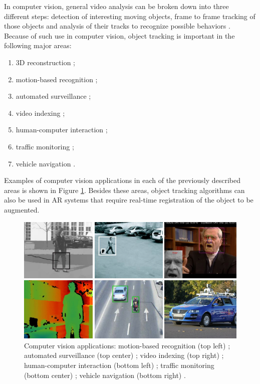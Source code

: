 In computer vision, general video analysis can be broken down into three different steps: detection of interesting moving objects, frame to frame tracking of those objects and analysis of their tracks to recognize possible behaviors \cite{Yilmaz2006}. Because of such use in computer vision, object tracking is important in the following major areas:

\begin{enumerate}
  \item 3D reconstruction \cite{Zhou2008};
  \item motion-based recognition \cite{Cedras1995};
  \item automated surveillance \cite{Javed2002};
  \item video indexing \cite{Javed2002};
  \item human-computer interaction \cite{Ren2010};
  \item traffic monitoring \cite{Gloyer1994};
  \item vehicle navigation \cite{Jia2009}.
\end{enumerate}

Examples of computer vision applications in each of the previously described areas is shown in Figure \ref{figure:cv_applications}. Besides these areas, object tracking algorithms can also be used in AR systems that require real-time registration of the object to be augmented.

\begin{figure}[!htb]
  \centering
  \includegraphics[width=\linewidth]{chapters/basic_concepts/cv_applications.png}
  \caption{Computer vision applications: motion-based recognition (top left) \cite{Cedras1995}; automated surveillance (top center) \cite{Javed2002}; video indexing (top right) \cite{Javed2002}; human-computer interaction (bottom left) \cite{Ren2010}; traffic monitoring (bottom center) \cite{Gloyer1994}; vehicle navigation (bottom right) \cite{Jia2009}.}
  \label{figure:cv_applications}
\end{figure}

